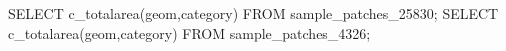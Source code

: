\lstset{caption=Crear una función para calcular el IDW (I),label= IDW1}
\begin{SQL}
SELECT c_totalarea(geom,category) FROM sample_patches_25830;
SELECT c_totalarea(geom,category) FROM sample_patches_4326;
\end{SQL}
